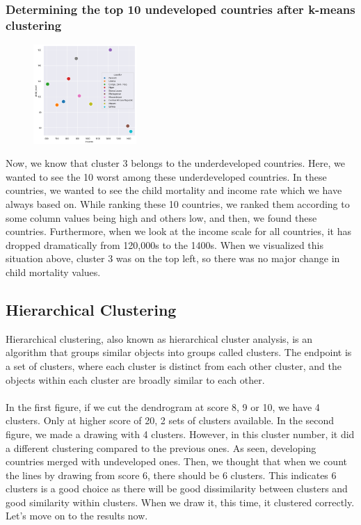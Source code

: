 \documentclass[onecolumn]{article}
\begin{document}
\subsubsection{Determining the top 10 undeveloped countries after k-means clustering}

\large\begin{figure} 
    \vspace{\dimexpr0.05\baselineskip-\topskip}%
    \centering
    \includegraphics[width=0.35\textwidth]{10country.png}
\end{figure}

Now, we know that cluster 3 belongs to the underdeveloped countries. Here, we wanted to see the 10 worst among these underdeveloped countries. In these countries, we wanted to see the child mortality and income rate which we have always based on. While ranking these 10 countries, we ranked them according to some column values being high and others low, and then, we found these countries. Furthermore, when we look at the income scale for all countries, it has dropped dramatically from  120,000s to the 1400s. When we visualized this situation above, cluster 3 was on the top left, so there was no major change in child mortality values.

\subsection{Hierarchical Clustering}
Hierarchical clustering, also known as hierarchical cluster analysis, is an algorithm that groups similar objects into groups called clusters. The endpoint is a set of clusters, where each cluster is distinct from each other cluster, and the objects within each cluster are broadly similar to each other.\\\\
In the first figure, if we cut the dendrogram at score 8, 9 or 10, we have 4 clusters. Only at higher score of 20, 2 sets of clusters available. In the second figure, we made a drawing with 4 clusters. However, in this cluster number, it did a different clustering compared to the previous ones. As seen, developing countries merged with undeveloped ones.
Then, we thought that when we count the lines by drawing from score 6, there should be 6 clusters. This indicates 6 clusters is a good choice as there will be good dissimilarity between clusters and good similarity within clusters. When we draw it, this time, it clustered correctly. Let's move on to the results now.\\
\end{document}
